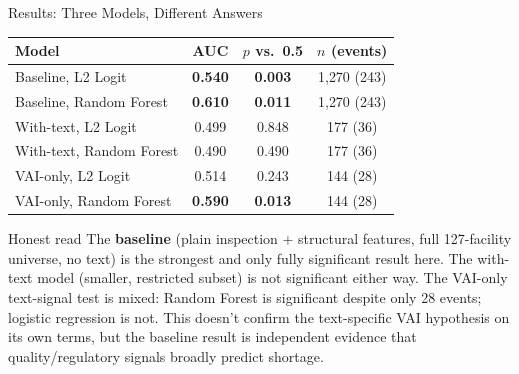 \documentclass[aspectratio=169,10pt]{beamer}
\newcommand{\highlight}[1]{{\color{ncsuRed}\textbf{#1}}}
\begin{document}
\begin{frame}{Results: Three Models, Different Answers}
{\small
\begin{tabular}{lccc}
\toprule
Model & AUC & $p$ vs.\ 0.5 & $n$ (events) \\
\midrule
Baseline, L2 Logit           & \highlight{0.540} & \highlight{0.003} & 1{,}270 (243) \\
Baseline, Random Forest      & \highlight{0.610} & \highlight{0.011} & 1{,}270 (243) \\
\midrule
With-text, L2 Logit          & 0.499 & 0.848 & 177 (36) \\
With-text, Random Forest     & 0.490 & 0.490 & 177 (36) \\
\midrule
VAI-only, L2 Logit           & 0.514 & 0.243 & 144 (28) \\
VAI-only, Random Forest      & \highlight{0.590} & \highlight{0.013} & 144 (28) \\
\bottomrule
\end{tabular}
}
\vspace{10pt}
\pause
\begin{alertblock}{Honest read}
\small The \textbf{baseline} (plain inspection + structural features, full 127-facility
universe, no text) is the strongest and only fully significant result here. The with-text
model (smaller, restricted subset) is not significant either way. The VAI-only text-signal
test is mixed: Random Forest is significant despite only 28 events; logistic regression is
not. This doesn't confirm the text-specific VAI hypothesis on its own terms, but the baseline
result is independent evidence that quality/regulatory signals broadly predict shortage.
\end{alertblock}
\end{frame}
\end{document}
